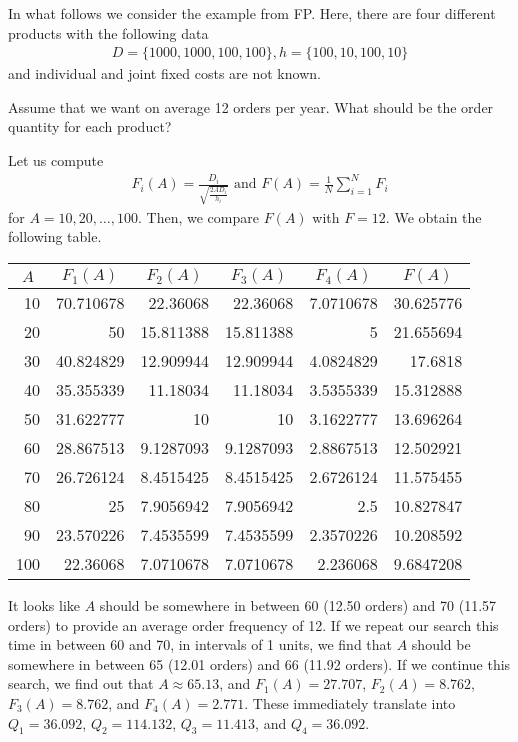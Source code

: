 In what follows we consider the example from FP. Here, there are four different products with the following data 
\begin{align*}
D=\{1000,1000,100,100\}, h=\{100,10,100,10\}
\end{align*}
and individual and joint fixed costs are not known.

\begin{exercise}
Assume that we want on average 12 orders per year. What should be the order quantity for each product?


\begin{solution}
Let us compute 
\begin{align*}
F_i(A)=\frac{D_i}{\sqrt{\frac{2AD_i}{h_i}}} \text{ and } F(A)=\frac{1}{N} \sum_{i=1}^N F_i
\end{align*}
for $A=10,20,\ldots,100$. Then, we compare $F(A)$ with $F=12$. We obtain the following table.

\begin{center}
    \begin{tabular}{rrrrrr}
\multicolumn{1}{c}{$A$} & \multicolumn{1}{c}{$F_1(A)$} & \multicolumn{1}{c}{$F_2(A)$} & \multicolumn{1}{c}{$F_3(A)$} & \multicolumn{1}{c}{$F_4(A)$} & \multicolumn{1}{c}{$F(A)$} \\
    \toprule
    10    & 70.710678 & 22.36068 & 22.36068 & 7.0710678 & 30.625776 \\
    20    & 50    & 15.811388 & 15.811388 & 5     & 21.655694 \\
    30    & 40.824829 & 12.909944 & 12.909944 & 4.0824829 & 17.6818 \\
    40    & 35.355339 & 11.18034 & 11.18034 & 3.5355339 & 15.312888 \\
    50    & 31.622777 & 10    & 10    & 3.1622777 & 13.696264 \\
    60    & 28.867513 & 9.1287093 & 9.1287093 & 2.8867513 & 12.502921 \\
    70    & 26.726124 & 8.4515425 & 8.4515425 & 2.6726124 & 11.575455 \\
    80    & 25    & 7.9056942 & 7.9056942 & 2.5   & 10.827847 \\
    90    & 23.570226 & 7.4535599 & 7.4535599 & 2.3570226 & 10.208592 \\
    100   & 22.36068 & 7.0710678 & 7.0710678 & 2.236068 & 9.6847208 \\
    \bottomrule
    \end{tabular}
\end{center}

It looks like $A$ should be somewhere in between 60 (12.50 orders) and 70 (11.57 orders) to provide an average order frequency of 12. If we repeat our search this time in between 60 and 70, in intervals of 1 units, we find that $A$ should be somewhere in between 65 (12.01 orders) and 66 (11.92 orders). If we continue this search, we find out that $A\approx 65.13$, and $F_1(A)=27.707$, $F_2(A)=8.762$, $F_3(A)=8.762$, and $F_4(A)=2.771$. These immediately translate into $Q_1=36.092$, $Q_2=114.132$, $Q_3=11.413$, and $Q_4=36.092$.
\end{solution}
\end{exercise}

